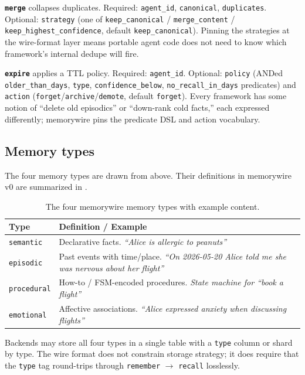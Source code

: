 \documentclass[11pt,letterpaper,twocolumn]{article}
\begin{document}
\textbf{\texttt{merge}} collapses duplicates. Required: \texttt{agent\_id}, \texttt{canonical}, \texttt{duplicates}. Optional: \texttt{strategy} (one of \texttt{keep\_canonical} / \texttt{merge\_content} / \texttt{keep\_highest\_confidence}, default \texttt{keep\_canonical}). Pinning the strategies at the wire-format layer means portable agent code does not need to know which framework's internal dedupe will fire.

\textbf{\texttt{expire}} applies a TTL policy. Required: \texttt{agent\_id}. Optional: \texttt{policy} (ANDed \texttt{older\_than\_days}, \texttt{type}, \texttt{confidence\_below}, \texttt{no\_recall\_in\_days} predicates) and \texttt{action} (\texttt{forget}/\texttt{archive}/\texttt{demote}, default \texttt{forget}). Every framework has some notion of ``delete old episodics'' or ``down-rank cold facts,'' each expressed differently; memorywire pins the predicate DSL and action vocabulary.

\subsection{Memory types}
\label{sec:spec-types}

The four memory types are drawn from  above. Their definitions in memorywire v0 are summarized in .

\begin{table}[t]
\centering
\caption{The four memorywire memory types with example content.}
\label{tab:types}
\small
\begin{tabularx}{\columnwidth}{lX}
\toprule
\textbf{Type} & \textbf{Definition / Example} \\
\midrule
\texttt{semantic}   & Declarative facts. \emph{``Alice is allergic to peanuts''} \\
\texttt{episodic}   & Past events with time/place. \emph{``On 2026-05-20 Alice told me she was nervous about her flight''} \\
\texttt{procedural} & How-to / FSM-encoded procedures. \emph{State machine for ``book a flight''} \\
\texttt{emotional}  & Affective associations. \emph{``Alice expressed anxiety when discussing flights''} \\
\bottomrule
\end{tabularx}
\end{table}

Backends may store all four types in a single table with a \texttt{type} column or shard by type. The wire format does not constrain storage strategy; it does require that the \texttt{type} tag round-trips through \texttt{remember} $\rightarrow$ \texttt{recall} losslessly.
\end{document}
